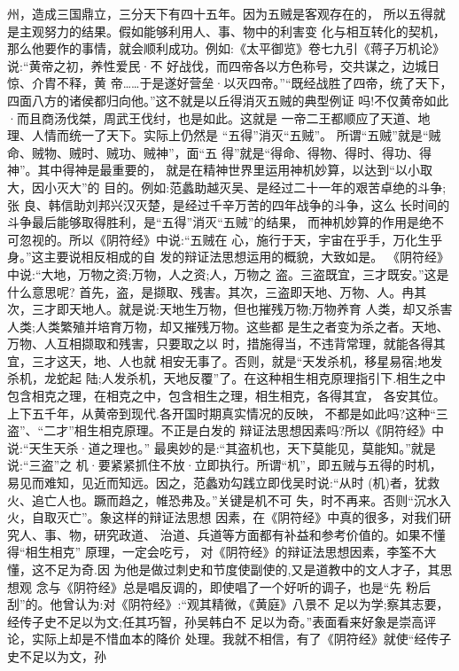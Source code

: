 \documentclass[12pt,UTF8]{ctexbook}
\begin{document}
州，造成三国鼎立，三分天下有四十五年。因为五贼是客观存在的，
所以五得就是主观努力的结果。假如能够利用人、事、物中的利害变
化与相互转化的契机，那么他要作的事情，就会顺利成功。例如:《太平御览》卷七九引《蒋子万机论》说:“黄帝之初，养性爱民·不
好战伐，而四帝各以方色称号，交共谋之，边城日惊、介胄不释，黄
帝……于是遂好营垒·以灭四帝。”“既经战胜了四帝，统了天下，
四面八方的诸侯都归向他。”这不就是以丘得消灭五贼的典型例证
吗!不仅黄帝如此·而且商汤伐桀，周武王伐纣，也是如此。这就是
一帝二王都顺应了天道、地理、人情而统一了天下。实际上仍然是
“五得”消灭“五贼”。
所谓“五贼”就是“贼命、贼物、贼时、贼功、贼神”，面“五
得”就是“得命、得物、得时、得功、得神”。其中得神是最重要的，
就是在精神世界里运用神机妙算，以达到“以小取大，因小灭大”的
目的。例如:范蠡助越灭吴、是经过二十一年的艰苦卓绝的斗争;张
良、韩信助刘邦兴汉灭楚，是经过千辛万苦的四年战争的斗争，这么
长时间的斗争最后能够取得胜利，是“五得”消灭“五贼”的结果，
而神机妙算的作用是绝不可忽视的。所以《阴符经》中说:“五贼在
心，施行于天，宇宙在乎手，万化生乎身。”这主要说相反相成的自
发的辩证法思想运用的概貌，大致如是。
《阴符经》中说:“大地，万物之资;万物，人之资;人，万物之
盗。三盗既宜，三才既安。”这是什么意思呢?
首先，盗，是撷取、残害。其次，三盗即天地、万物、人。冉其
次，三才即天地人。就是说:天地生万物，但也摧残万物;万物养育
人类，却又杀害人类;人类繁殖并培育万物，却又摧残万物。这些都
是生之者变为杀之者。天地、万物、人互相撷取和残害，只要取之以
时，措施得当，不违背常理，就能各得其宜，三才这天，地、人也就
相安无事了。否则，就是“天发杀机，移星易宿;地发杀机，龙蛇起
陆;人发杀机，天地反覆”了。在这种相生相克原理指引下.相生之中包含相克之理，在相克之中，包含相生之理，相生相克，各得其宜，
各安其位。上下五千年，从黄帝到现代.各开国时期真实情况的反映，
不都是如此吗?这种“三盗”、“二才”相生相克原理。不正是白发的
辩证法思想因素吗?所以《阴符经》中说:“天生天杀·道之理也。”
最奥妙的是:“其盗机也，天下莫能见，莫能知。”就是说:“三盗”之
机·要紧紧抓住不放·立即执行。所谓“机”，即五贼与五得的时机，
易见而难知，见近而知远。因之，范蠡劝勾践立即伐吴时说:“从时
(机)者，犹救火、追亡人也。蹶而趋之，帷恐弗及。”关键是机不可
失，时不再来。否则“沉水入火，自取灭亡”。象这样的辩证法思想
因素，在《阴符经》中真的很多，对我们研究人、事、物，研究政道、
治道、兵道等方面都有补益和参考价值的。如果不懂得“相生相克”
原理，一定会吃亏，
对《阴符经》的辩证法思想因素，李筌不大懂，这不足为奇.因
为他是做过刺史和节度使副使的,又是道教中的文人才子，其思想观
念与《阴符经》总是唱反调的，即使唱了一个好听的调子，也是“先
粉后刮”的。他曾认为:对《阴符经》:“观其精微，《黄庭》八景不
足以为学;察其志要，经传子史不足以为文;任其巧智，孙吴韩白不
足以为奇。”表面看来好象是崇高评论，实际上却是不惜血本的降价
处理。我就不相信，有了《阴符经》就使“经传子史不足以为文，孙
\end{document}
